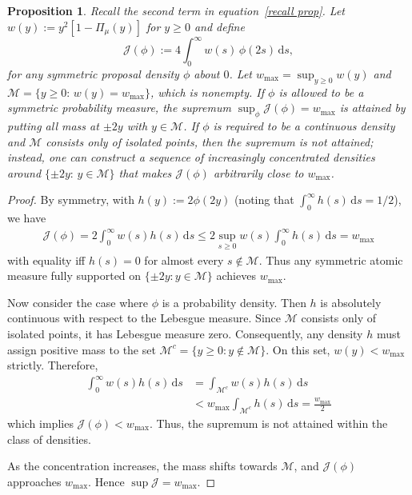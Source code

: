 \documentclass[10pt,a4paper]{amsart}
\newtheorem{proposition}{Proposition}
\newcommand{\df}{\mathrm{d}}
\begin{document}
\begin{proposition}\label{cant attain}
Recall the second term in equation~\eqref{recall prop}. Let $w(y):=y^2[1-\Pi_\mu(y)]$ for $y\ge 0$ and define
\[
\mathcal{J}(\phi):=4\int_{0}^{\infty} w(s)\,\phi(2s)\,\df s,
\]
for any symmetric proposal density $\phi$ about $0$. 
Let $w_{\max}=\sup_{y\ge 0} w(y)$ and 
$\mathcal{M}=\{y\ge 0:\,w(y)=w_{\max}\}$, which is nonempty. 
If $\phi$ is allowed to be a symmetric probability measure, 
the supremum $\sup_\phi\mathcal{J}(\phi)=w_{\max}$ is attained by putting all mass at $\pm 2y$ with $y\in\mathcal{M}$. 
If $\phi$ is required to be a continuous density and $\mathcal{M}$ consists only of isolated points, then the supremum is not attained; 
instead, one can construct a sequence of increasingly concentrated densities around $\{\pm 2y:\,y\in\mathcal{M}\}$ that makes $\mathcal{J}(\phi)$ arbitrarily close to $w_{\max}$.

\end{proposition}

\begin{proof}
By symmetry, with $h(y):=2\phi(2y)$ (noting that $\int_0^\infty h(s)\,\df s = 1/2$), we have
\begin{align*}
\mathcal{J}(\phi)=2\int_{0}^{\infty} w(s)h(s)\,\df s
\le 2\sup_{s\ge0}w(s)\!\int_{0}^{\infty}h(s)\,\df s=w_{\max}
\end{align*}
with equality iff $h(s)=0$ for almost every $s \notin \mathcal{M}$.
Thus any symmetric atomic measure fully supported on $\{\pm 2y:y\in\mathcal{M}\}$ achieves $w_{\max}$.

Now consider the case where $\phi$ is a probability density. Then $h$ is absolutely continuous with respect to the Lebesgue measure.
Since $\mathcal{M}$ consists only of isolated points, it has Lebesgue measure zero.
Consequently, any density $h$ must assign positive mass to the set $\mathcal{M}^c = \{y \ge 0 : y \notin \mathcal{M}\}$.
On this set, $w(y) < w_{\max}$ strictly.
Therefore,
\begin{align*}
    \int_{0}^{\infty} w(s)h(s)\,\df s& = \int_{\mathcal{M}^c} w(s)h(s)\,\df s\\ &< w_{\max} \int_{\mathcal{M}^c} h(s)\,\df s = \frac{w_{\max}}{2}
\end{align*}
which implies $\mathcal{J}(\phi) < w_{\max}$. Thus, the supremum is not attained within the class of densities.

As the concentration increases, the mass shifts towards $\mathcal{M}$, and $\mathcal{J}(\phi)$ approaches $w_{\max}$.
Hence $\sup\mathcal{J}=w_{\max}$.
\end{proof}
\end{document}
